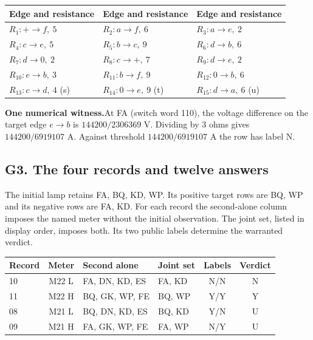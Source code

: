 \documentclass[12pt,letterpaper]{article}
\newcommand{\dossier}[2]{\clearpage\subsection*{#1}\phantomsection\label{#2}}
\newcommand{\reading}[2]{\par\smallskip\textsf{\color{accent}\bfseries #1}\enspace #2\par}
\begin{document}
\begin{center}{\footnotesize\setlength{\tabcolsep}{4pt}\begin{tabularx}{\linewidth}{@{}YYY@{}}\toprule
Edge and resistance & Edge and resistance & Edge and resistance\\ \midrule
$R_{1}\colon +\!\to\!f,\ 5$ & $R_{2}\colon a\!\to\!f,\ 6$ & $R_{3}\colon a\!\to\!e,\ 2$\\
$R_{4}\colon c\!\to\!e,\ 5$ & $R_{5}\colon b\!\to\!c,\ 9$ & $R_{6}\colon d\!\to\!b,\ 6$\\
$R_{7}\colon d\!\to\!0,\ 2$ & $R_{8}\colon c\!\to\!+,\ 7$ & $R_{9}\colon d\!\to\!e,\ 2$\\
$R_{10}\colon e\!\to\!b,\ 3$ & $R_{11}\colon b\!\to\!f,\ 9$ & $R_{12}\colon 0\!\to\!b,\ 6$\\
$R_{13}\colon c\!\to\!d,\ 4$ (s) & $R_{14}\colon 0\!\to\!e,\ 9$ (t) & $R_{15}\colon d\!\to\!a,\ 6$ (u)\\\bottomrule\end{tabularx}}\end{center}

\reading{One numerical witness.}{At FA (switch word 110), the voltage difference on the target edge $e\to b$ is $144200/2306369$ V. Dividing by 3 ohms gives $144200/6919107$ A. Against threshold $144200/6919107$ A the row has label N.}

\dossier{G3. The four records and twelve answers}{obsG3}

The initial lamp retains FA, BQ, KD, WP. Its positive target rows are BQ, WP and its negative rows are FA, KD. For each record the second-alone column imposes the named meter without the initial observation. The joint set, listed in display order, imposes both. Its two public labels determine the warranted verdict.

\begin{center}{\footnotesize\setlength{\tabcolsep}{4pt}\begin{tabularx}{\linewidth}{@{}lcYYcc@{}}\toprule
Record & Meter & Second alone & Joint set & Labels & Verdict\\  & M22 L & FA, DN, KD, ES & FA, KD & N/N & N\\
11 & M22 H & BQ, GK, WP, FE & BQ, WP & Y/Y & Y\\
08 & M21 L & BQ, DN, KD, ES & BQ, KD & Y/N & U\\
09 & M21 H & FA, GK, WP, FE & FA, WP & N/Y & U\\\bottomrule\end{tabularx}}\end{center}
\end{document}
